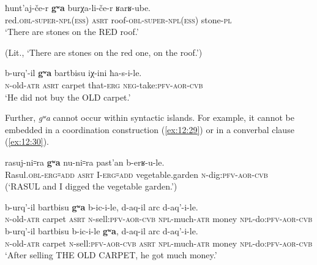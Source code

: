 ﻿\documentclass[output=paper]{langsci/langscibook}
\begin{document}
\ea \label{ex:12:27} %
\gll ħunt'aj-če-r \textbf{gʷa} burχa-li-če-r ʁarʁ-ube.\\
red.\textsc{obl}-\textsc{super}-\textsc{npl}(\textsc{ess}) \textsc{asrt} roof-\textsc{obl}-\textsc{super}-\textsc{npl}(\textsc{ess}) stone-\textsc{pl}\\
\glt `There are stones on the RED roof.'

(Lit., `There are stones on the red one, on the roof.')

\ex \label{ex:12:28} %
\gll b-urq'-il \textbf{gʷa} bartbisu iχ-ini ħa-s-i-le.\\
\textsc{n}-old-\textsc{atr} \textsc{asrt} carpet that-\textsc{erg} \textsc{neg}-take:\textsc{pfv}-\textsc{aor}-\textsc{cvb}\\
\glt `He did not buy the OLD carpet.'
\z

Further, \emph{gʷa} cannot occur within syntactic islands.
For example,
it cannot be embedded in a coordination construction (\ref{ex:12:29}) or in a
converbal clause (\ref{ex:12:30}).

\ea \label{ex:12:29} %
\gll *rasuj-ni꞊ra \textbf{gʷa} nu-ni꞊ra past'an b-erʁ-u-le.\\
Rasul.\textsc{obl}-\textsc{erg}꞊\textsc{add} \textsc{asrt} I-\textsc{erg}꞊\textsc{add} vegetable.garden \textsc{n}-dig:\textsc{pfv}-\textsc{aor}-\textsc{cvb}\\
\glt (`RASUL and I digged the vegetable garden.')

\ex \label{ex:12:30} %
\ea %
\gll *b-urq'-il bartbisu \textbf{gʷa} b-ic-i-le, d-aq-il arc d-aq'-i-le.\\
\textsc{n}-old-\textsc{atr} carpet \textsc{asrt} \textsc{n}-sell:\textsc{pfv}-\textsc{aor}-\textsc{cvb} \textsc{npl}-much-\textsc{atr} money \textsc{npl}-do:\textsc{pfv}-\textsc{aor}-\textsc{cvb} \\

\ex %
\gll b-urq'-il bartbisu b-ic-i-le \textbf{gʷa}, d-aq-il arc d-aq'-i-le.\\
\textsc{n}-old-\textsc{atr} carpet \textsc{n}-sell:\textsc{pfv}-\textsc{aor}-\textsc{cvb} \textsc{asrt} \textsc{npl}-much-\textsc{atr} money \textsc{npl}-do:\textsc{pfv}-\textsc{aor}-\textsc{cvb} \\
\glt `After selling THE OLD CARPET, he got much money.'
\z
\z
\end{document}
